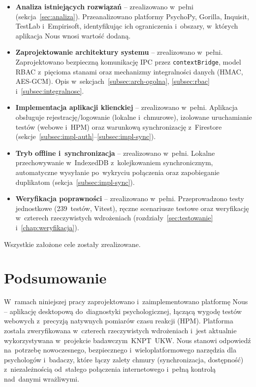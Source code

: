 \documentclass[12pt, a4paper, oneside]{report}
\begin{document}
\begin{itemize}
	\item \textbf{Analiza istniejących rozwiązań} -- zrealizowano w~pełni (sekcja~\ref{sec:analiza}). Przeanalizowano platformy PsychoPy, Gorilla, Inquisit, TestLab i~Empirisoft, identyfikując ich ograniczenia i~obszary, w~których aplikacja Nous wnosi wartość dodaną.
	\item \textbf{Zaprojektowanie architektury systemu} -- zrealizowano w~pełni. Zaprojektowano bezpieczną komunikację IPC przez \texttt{contextBridge}, model RBAC z~pięcioma stanami oraz mechanizmy integralności danych (HMAC, AES-GCM). Opis w~sekcjach~\ref{subsec:arch-ogolna}, \ref{subsec:rbac} i~\ref{subsec:integralnosc}.
	\item \textbf{Implementacja aplikacji klienckiej} -- zrealizowano w~pełni. Aplikacja obsługuje rejestrację/logowanie (lokalne i~chmurowe), izolowane uruchamianie testów (webowe i~HPM) oraz warunkową synchronizację z~Firestore (sekcje~\ref{subsec:impl-auth}--\ref{subsec:impl-sync}).
	\item \textbf{Tryb offline i~synchronizacja} -- zrealizowano w~pełni. Lokalne przechowywanie w~IndexedDB z~kolejkowaniem synchronicznym, automatyczne wysyłanie po~wykryciu połączenia oraz zapobieganie duplikatom (sekcja~\ref{subsec:impl-sync}).
	\item \textbf{Weryfikacja poprawności} -- zrealizowano w~pełni. Przeprowadzono testy jednostkowe (239~testów, Vitest), ręczne scenariusze testowe oraz weryfikację w~czterech rzeczywistych wdrożeniach (rozdziały~\ref{sec:testowanie} i~\ref{chap:weryfikacja}).
\end{itemize}

Wszystkie założone cele zostały zrealizowane.


\section{Podsumowanie}
\label{sec:podsumowanie-ogolne}

W~ramach niniejszej pracy zaprojektowano i~zaimplementowano platformę Nous -- aplikację desktopową do~diagnostyki psychologicznej, łączącą wygodę testów webowych z~precyzją natywnych pomiarów czasu reakcji (HPM). Platforma została zweryfikowana w~czterech rzeczywistych wdrożeniach i~jest aktualnie wykorzystywana w~projekcie badawczym~KNPT~UKW. Nous stanowi odpowiedź na~potrzebę nowoczesnego, bezpiecznego i~wieloplatformowego narzędzia dla psychologów i~badaczy, które łączy zalety chmury (synchronizacja, dostępność) z~niezależnością od~stałego połączenia internetowego i~pełną kontrolą nad~danymi wrażliwymi.
\end{document}
